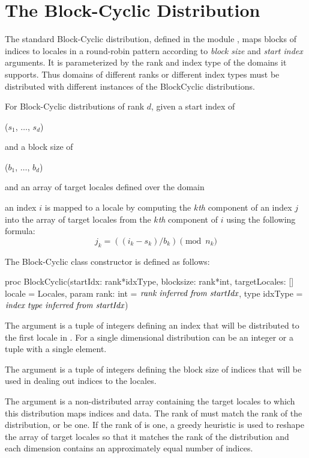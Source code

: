 \section{The Block-Cyclic Distribution}
\label{Block_Cyclic_Dist}
The standard Block-Cyclic distribution, defined in the
module , maps blocks of indices to locales in a
round-robin pattern according to \emph{block size} and \emph{start
index} arguments.  It is parameterized by the rank and index type of
the domains it supports.  Thus domains of different ranks or different
index types must be distributed with different instances of the
BlockCyclic distributions.

For Block-Cyclic distributions of rank $d$, given a start index of
\begin{chapel}
($s_1$, $\ldots$, $s_d$)
\end{chapel}
and a block size of
\begin{chapel}
($b_1$, $\ldots$, $b_d$)
\end{chapel}
and an array of target locales defined over the domain
\begin{chapel}
[$0$..$n_1$-1, $\ldots$, $0$..$n_d$-1]
\end{chapel}
an index $i$ is mapped to a locale by computing
the $k$\emph{th} component of an index $j$ into the array of target
locales from the $k$\emph{th} component of $i$ using the following
formula:
\[j_k = ((i_k - s_k) / b_k) \pmod{n_k}\]

The Block-Cyclic class constructor is defined as follows:
\begin{chapel}
proc BlockCyclic(startIdx: rank*idxType,
                 blocksize: rank*int,
                 targetLocales: [] locale = Locales,
                 param rank: int = $\mbox{{\it rank inferred from startIdx}}$,
                 type idxType = $\mbox{{\it index type inferred from startIdx}}$)
\end{chapel}

The argument  is a tuple of integers defining an index that
will be distributed to the first locale in . For a single
dimensional distribution  can be an integer or a tuple with a
single element.

The argument  is a tuple of integers defining
the block size of indices that will be used in dealing out indices
to the locales.

The argument  is a non-distributed array
containing the target locales to which this distribution maps indices
and data.  The rank of  must match the rank of the
distribution, or be one.  If the rank of
 is one, a greedy heuristic is used to reshape the
array of target locales so that it matches the rank of the
distribution and each dimension contains an approximately equal number
of indices.

